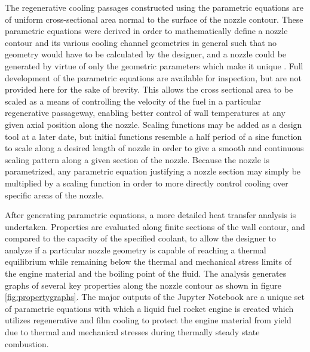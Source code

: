 \documentclass[]{aiaa-tc}%
\begin{document}
The regenerative cooling passages constructed using the parametric equations are of uniform cross-sectional area normal to the surface of the nozzle contour. These parametric equations were derived in order to mathematically define a nozzle contour and its various cooling channel geometries in general such that no geometry would have to be calculated by the designer, and a nozzle could be generated by virtue of only the geometric parameters which make it unique \cite{parametricEQs}. Full development of the parametric equations are available for inspection, but are not provided here for the sake of brevity. This allows the  cross sectional area to be scaled as a means of controlling the velocity of the fuel in a particular regenerative passageway, enabling better control of wall temperatures at any given axial position along the nozzle. Scaling functions may be added as a design tool at a later date, but initial functions resemble a half period of a sine function to scale along a desired length of nozzle in order to give a smooth and continuous scaling pattern along a given section of the nozzle. Because the nozzle is parametrized, any parametric equation justifying a nozzle section may simply be multiplied by a scaling function in order to more directly control cooling over specific areas of the nozzle.
 
After generating parametric equations, a more detailed heat transfer analysis is undertaken. Properties are evaluated along finite sections of the wall contour, and compared to the capacity of the specified coolant, to allow the designer to analyze if a particular nozzle geometry is capable of reaching a thermal equilibrium while remaining below the thermal and mechanical stress limits of the engine material and the boiling point of the fluid. The analysis generates graphs of several key properties along the nozzle contour as shown in figure \ref{fig:propertygraphs}. The major outputs of the Jupyter Notebook are a unique set of parametric equations with which a liquid fuel rocket engine is created which utilizes regenerative and film cooling to protect the engine material from yield due to thermal and mechanical stresses during thermally steady state combustion.

\end{document}
